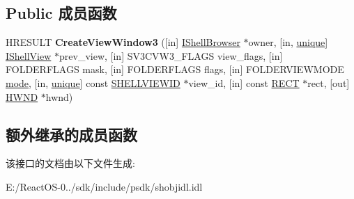 \subsection*{Public 成员函数}
\begin{DoxyCompactItemize}
\item 
\mbox{\label{interface_i_shell_view3_a42f2be2134c1b556335a32642945a00e}} 
H\+R\+E\+S\+U\+LT {\bfseries Create\+View\+Window3} (\mbox{[}in\mbox{]} \hyperlink{interface_i_shell_browser}{I\+Shell\+Browser} $\ast$owner, \mbox{[}in, \hyperlink{interfaceunique}{unique}\mbox{]} \hyperlink{interface_i_shell_view}{I\+Shell\+View} $\ast$prev\+\_\+view, \mbox{[}in\mbox{]} S\+V3\+C\+V\+W3\+\_\+\+F\+L\+A\+GS view\+\_\+flags, \mbox{[}in\mbox{]} F\+O\+L\+D\+E\+R\+F\+L\+A\+GS mask, \mbox{[}in\mbox{]} F\+O\+L\+D\+E\+R\+F\+L\+A\+GS flags, \mbox{[}in\mbox{]} F\+O\+L\+D\+E\+R\+V\+I\+E\+W\+M\+O\+DE \hyperlink{interfacevoid}{mode}, \mbox{[}in, \hyperlink{interfaceunique}{unique}\mbox{]} const \hyperlink{interface_g_u_i_d}{S\+H\+E\+L\+L\+V\+I\+E\+W\+ID} $\ast$view\+\_\+id, \mbox{[}in\mbox{]} const \hyperlink{structtag_r_e_c_t}{R\+E\+CT} $\ast$rect, \mbox{[}out\mbox{]} \hyperlink{interfacevoid}{H\+W\+ND} $\ast$hwnd)
\end{DoxyCompactItemize}
\subsection*{额外继承的成员函数}


该接口的文档由以下文件生成\+:\begin{DoxyCompactItemize}
\item 
E\+:/\+React\+O\+S-\/0../sdk/include/psdk/shobjidl.\+idl\end{DoxyCompactItemize}
